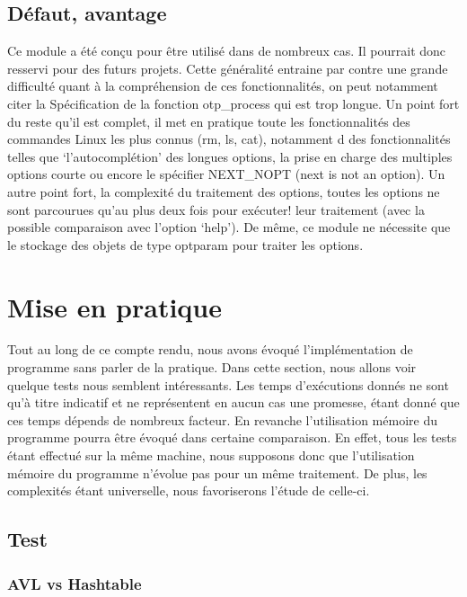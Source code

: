 \documentclass[12pt]{article}
\begin{document}
    \subsection{Défaut, avantage}

    Ce module a été conçu pour être utilisé dans de nombreux cas. Il pourrait 
    donc resservi pour des futurs projets. Cette généralité entraine par contre 
    une grande difficulté quant à la compréhension de ces fonctionnalités, on 
    peut notamment citer la Spécification de la fonction otp\_process qui est 
    trop longue.
    Un point fort du reste qu'il est complet, il met en pratique toute les 
    fonctionnalités des commandes Linux les plus connus (rm, ls, cat), notamment d
    des fonctionnalités telles que `l'autocomplétion' des longues options, la prise
    en charge des multiples options courte ou encore le spécifier NEXT\_NOPT 
    (next is not an option). Un autre point fort, la complexité du traitement 
    des options, toutes les options ne sont parcourues qu'au plus deux fois pour 
    exécuter! leur traitement (avec la possible comparaison avec l'option 
    `help'). De même, ce module ne nécessite que le stockage des objets de type 
    optparam pour traiter les options.

    \section{Mise en pratique}\label{test}

    Tout au long de ce compte rendu, nous avons évoqué l'implémentation de 
    programme sans parler de la pratique. Dans cette section, nous allons voir
    quelque tests nous semblent intéressants.
    Les temps d'exécutions donnés ne sont qu'à titre indicatif et ne représentent en 
    aucun cas une promesse, étant donné que ces temps dépends de nombreux 
    facteur. En revanche l'utilisation mémoire du programme pourra être évoqué 
    dans certaine comparaison. En effet, tous les tests étant effectué sur la 
    même machine, nous supposons donc que l'utilisation mémoire du programme 
    n'évolue pas pour un même traitement. De plus, les complexités étant 
    universelle, nous favoriserons l'étude de celle-ci.

    \subsection{Test}

    \subsubsection{AVL vs Hashtable}\label{avl-has}
\end{document}
